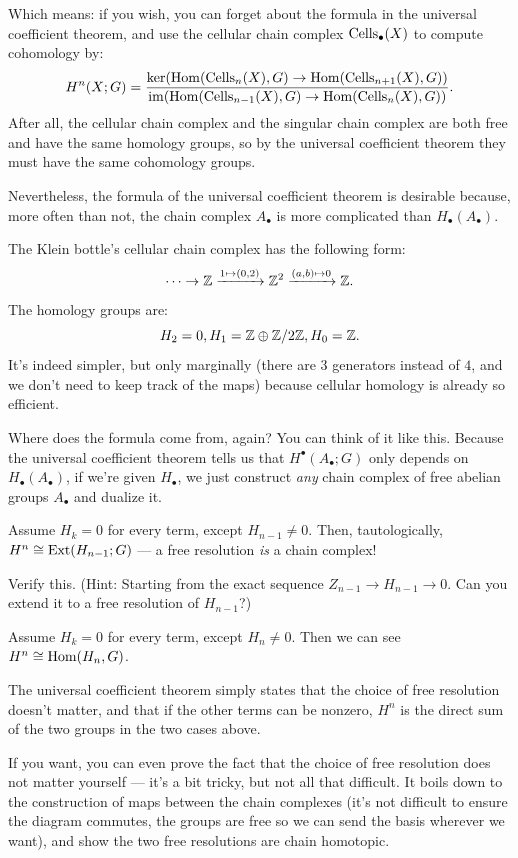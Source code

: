 Which means: if you wish, you can forget about the formula in the universal coefficient theorem,
and use the cellular chain complex $\operatorname{Cells}_\bullet(X)$ to compute cohomology by:
\[ H^n(X; G) = \frac{\ker(\operatorname{Hom}(\operatorname{Cells}_n(X), G) \to \operatorname{Hom}(\operatorname{Cells}_{n+1}(X), G))}
{\operatorname{im}(\operatorname{Hom}(\operatorname{Cells}_{n-1}(X), G) \to \operatorname{Hom}(\operatorname{Cells}_{n}(X), G))}. \]
After all, the cellular chain complex and the singular chain complex are both free and have the same
homology groups, so by the universal coefficient theorem they must have the same cohomology groups.

Nevertheless, the formula of the universal coefficient theorem is desirable because, more often than
not, the chain complex $A_\bullet$ is more complicated than $H_\bullet(A_\bullet)$.

\begin{example}
	The Klein bottle's cellular chain complex has the following form:
	\[ \cdots \to \mathbb Z \xrightarrow{1 \mapsto (0, 2)} \mathbb Z^2 \xrightarrow{(a, b) \mapsto 0} \mathbb Z. \]
	The homology groups are:
	\[ H_2 = 0, H_1 = \mathbb Z \oplus \mathbb Z/2\mathbb Z, H_0 = \mathbb Z. \]
	It's indeed simpler, but only marginally (there are $3$ generators instead of $4$, and we don't
	need to keep track of the maps)
	because cellular homology is already so efficient.
\end{example}

Where does the formula come from, again? You can think of it like this.
Because the universal coefficient theorem tells us that $H^\bullet(A_\bullet; G)$ only depends on
$H_\bullet(A_\bullet)$, if we're given $H_\bullet$, we just construct \emph{any} chain complex of
free abelian groups $A_\bullet$ and dualize it.

Assume $H_k = 0$ for every term, except $H_{n-1}\neq 0$. Then, tautologically,
$H^n \cong \operatorname{Ext}(H_{n-1}; G)$ --- a free resolution \emph{is} a chain complex!

\begin{exercise}
	Verify this. (Hint: Starting from the exact sequence $Z_{n-1} \to H_{n-1} \to 0$.
	Can you extend it to a free resolution of $H_{n-1}$?)
\end{exercise}

Assume $H_k = 0$ for every term, except $H_n \neq 0$. Then we can see $H^n \cong \operatorname{Hom}(H_n, G)$.

The universal coefficient theorem simply states that the choice of free resolution doesn't matter,
and that if the other terms can be nonzero, $H^n$ is the direct sum of the two groups in the two
cases above.

If you want, you can even prove the fact that the choice of free resolution does not matter yourself
--- it's a bit tricky, but not all that difficult. It boils down to the construction of maps
between the chain complexes (it's not difficult to ensure the diagram commutes, the groups are free
so we can send the basis wherever we want), and show the two free resolutions are chain homotopic.

